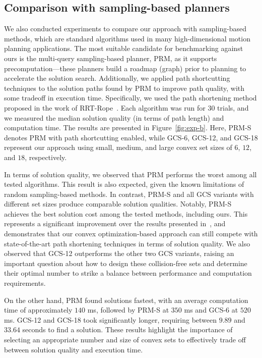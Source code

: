 \subsection{Comparison with sampling-based planners}\label{sec:sampling-based}

We also conducted experiments to compare our approach with sampling-based methods, which are standard algorithms used in many high-dimensional motion planning applications. The most suitable candidate for benchmarking against ours is the multi-query sampling-based planner, PRM, as it supports precomputation---these planners build a roadmap (graph) prior to planning to accelerate the solution search. Additionally, we applied path shortcutting techniques to the solution paths found by PRM to improve path quality, with some tradeoff in execution time. Specifically, we used the path shortening method proposed in the work of RRT-Rope~\cite{petit2021rrt}. Each algorithm was run for $30$ trials, and we measured the median solution quality (in terms of path length) and computation time. The results are presented in Figure~\ref{fig:exp-b}. Here, PRM-S denotes PRM with path shortcutting enabled, while GCS-6, GCS-12, and GCS-18 represent our approach using small, medium, and large convex set sizes of $6$, $12$, and $18$, respectively.

In terms of solution quality, we observed that PRM performs the worst among all tested algorithms. This result is also expected, given the known limitations of random sampling-based methods. In contrast, PRM-S and all GCS variants with different set sizes produce comparable solution qualities. Notably, PRM-S achieves the best solution cost among the tested methods, including ours. This represents a significant improvement over the results presented in~\cite{marcucci2023motion}, and demonstrates that our convex optimization-based approach can still compete with state-of-the-art path shortening techniques in terms of solution quality. We also observed that GCS-12 outperforms the other two GCS variants, raising an important question about how to design these collision-free sets and determine their optimal number to strike a balance between performance and computation requirements.

On the other hand, PRM found solutions fastest, with an average computation time of approximately $140$ ms, followed by PRM-S at $350$ ms and GCS-6 at $520$ ms. GCS-12 and GCS-18 took significantly longer, requiring between $9.89$ and $33.64$ seconds to find a solution. These results highlight the importance of selecting an appropriate number and size of convex sets to effectively trade off between solution quality and execution time.

